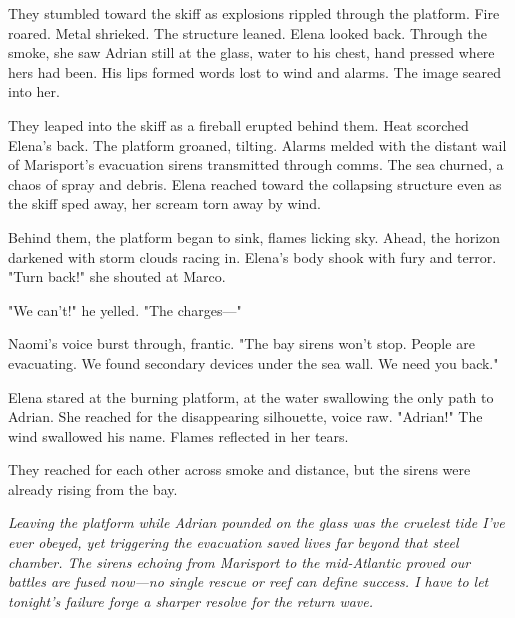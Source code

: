 They stumbled toward the skiff as explosions rippled through the platform. Fire roared. Metal shrieked. The structure leaned. Elena looked back. Through the smoke, she saw Adrian still at the glass, water to his chest, hand pressed where hers had been. His lips formed words lost to wind and alarms. The image seared into her.

They leaped into the skiff as a fireball erupted behind them. Heat scorched Elena's back. The platform groaned, tilting. Alarms melded with the distant wail of Marisport's evacuation sirens transmitted through comms. The sea churned, a chaos of spray and debris. Elena reached toward the collapsing structure even as the skiff sped away, her scream torn away by wind.

Behind them, the platform began to sink, flames licking sky. Ahead, the horizon darkened with storm clouds racing in. Elena's body shook with fury and terror. "Turn back!" she shouted at Marco.

"We can't!" he yelled. "The charges—"

Naomi's voice burst through, frantic. "The bay sirens won't stop. People are evacuating. We found secondary devices under the sea wall. We need you back."

Elena stared at the burning platform, at the water swallowing the only path to Adrian. She reached for the disappearing silhouette, voice raw. "Adrian!" The wind swallowed his name. Flames reflected in her tears.

They reached for each other across smoke and distance, but the sirens were already rising from the bay.


\noindent\textit{Leaving the platform while Adrian pounded on the glass was the cruelest tide I've ever obeyed, yet triggering the evacuation saved lives far beyond that steel chamber. The sirens echoing from Marisport to the mid-Atlantic proved our battles are fused now—no single rescue or reef can define success. I have to let tonight's failure forge a sharper resolve for the return wave.}
